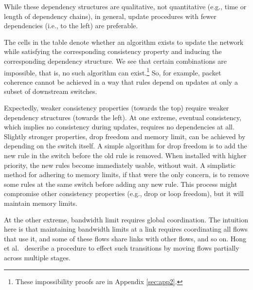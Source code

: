 
While these dependency structures are qualitative, not quantitative (e.g., time or length of dependency chains), in general, update procedures with fewer dependencies (i.e., to the left) are preferable.


The cells in the table denote whether an algorithm exists to update the network while satisfying the corresponding consistency property and inducing the corresponding dependency structure. We see that certain combinations are impossible, that is, no such algorithm can exist.\footnote{These impossibility proofs are in Appendix \ref{sec:app2}.} So, for example, packet coherence cannot be achieved in a way that rules depend on updates at only a subset of downstream switches.

Expectedly, weaker consistency properties (towards the top) require weaker dependency structures (towards the left). At one extreme, eventual consistency, which implies no consistency during updates, requires no dependencies at all.  Slightly stronger properties, drop freedom and memory limit, can be achieved by depending on the switch itself. A simple algorithm for drop freedom is to add the new rule in the switch before the old rule is removed. When installed with higher priority, the new rules become immediately usable, without wait.
A simplistic method for adhering to memory limits, if that were the only concern, is to remove some rules at the same switch before adding any new rule. This process might compromise other consistency properties (e.g., drop or loop freedom), but it will maintain memory limits.

At the other extreme, bandwidth limit requires global coordination. The intuition here is that maintaining bandwidth limits at a link requires coordinating all flows that use it, and some of these flows share links with other flows, and so on. Hong et al.~\cite{swan} describe a procedure to effect such transitions by moving flows partially across multiple stages.

